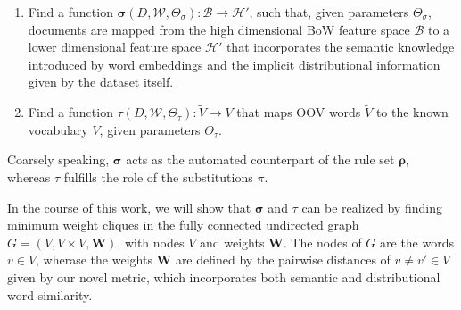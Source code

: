 \begin{enumerate}
  \item Find a function $\boldsymbol\sigma(D,\mathcal{W},\Theta_\sigma):
	\mathcal{B} \to \mathcal{H'}$, such that, given parameters $\Theta_\sigma$,
	documents are mapped from the high dimensional BoW feature space $\mathcal{B}$ 
	to a lower dimensional feature space $\mathcal{H'}$ that incorporates
	the semantic knowledge introduced by word embeddings and the implicit
	distributional information given by the dataset itself.

  \item Find a function $\tau(D,\mathcal{W}, \Theta_\tau): \tilde{V} \to V$ that
  maps OOV words $\tilde{V}$  to the known vocabulary $V$, given parameters
  $\Theta_\tau$.
  
\end{enumerate}

Coarsely speaking, $\boldsymbol\sigma$ acts as the automated counterpart  of the
rule set $\boldsymbol\rho$, whereas $\tau$ fulfills the role of the substitutions
$\pi$.

In the course of this work, we will show that $\boldsymbol\sigma$ and $\tau$ can
be realized by finding minimum weight cliques in the fully connected 
undirected graph $G=(V,V\times V,\mathbf{W})$, with nodes $V$ and weights
$\mathbf{W}$.
The nodes of $G$ are the words $v \in V$, wherase the weights
$\mathbf{W}$ are defined by the pairwise distances of $v\neq v' \in V$ given by
our novel metric, which incorporates both semantic and distributional
word similarity.
